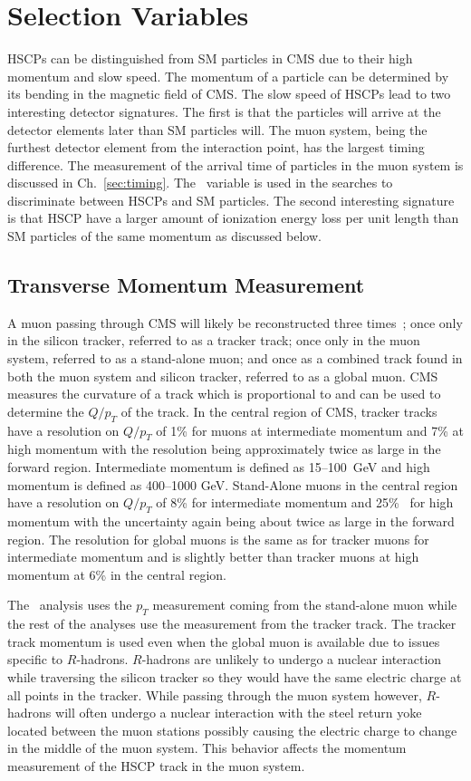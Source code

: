 \section{Selection Variables \label{sec:SelVar}}
HSCPs can be distinguished from SM particles in CMS due to their high momentum and slow speed.
The momentum of a particle can be determined by its bending in the magnetic field of CMS.
The slow speed of HSCPs lead to two interesting detector signatures. The first is that the particles will arrive at the detector elements later than SM particles will.
The muon system, being the furthest detector element from the interaction point, has the largest timing difference. The measurement of the arrival time of particles in the
muon system is discussed in Ch.~\ref{sec:timing}. The \invbeta\ variable is used in the searches to discriminate between HSCPs and SM particles.
The second interesting signature is that HSCP have a larger amount of ionization energy loss per unit length 
than SM particles of the same momentum as discussed below.

\subsection{Transverse Momentum Measurement \label{sec:PMeasurement}}
A muon passing through CMS will likely be reconstructed three times~\cite{2012JInst...7P0002T}; once only in the silicon tracker, referred to as a tracker track;
once only in the muon system, referred to as a stand-alone muon; and once as a combined track found in both the muon system and silicon tracker, referred
to as a global muon. CMS measures the curvature of a track which is proportional to and can be used to determine the $Q/p_T$ of the track.
In the central region of CMS, tracker tracks have a resolution on $Q/p_T$ of 1\% for muons at intermediate momentum and 7\% at
high momentum with the resolution being approximately
twice as large in the forward region. Intermediate momentum is defined as 15--100~GeV and high momentum is defined as 400--1000 GeV.
Stand-Alone muons in the central region have a resolution on $Q/p_T$ of 8\% for intermediate momentum and 25\%~\cite{2008AN097} for high momentum with the uncertainty again
being about twice as large in the forward region. The resolution for global muons is the same as for tracker muons for intermediate momentum and is slightly better
than tracker muons at high momentum at 6\% in the central region.

The \muononly\ analysis uses the $p_T$ measurement coming from the stand-alone muon while the rest of the analyses use the measurement from the tracker track.
The tracker track momentum is used even when the global muon is available due to issues specific to $R$-hadrons.
$R$-hadrons are unlikely to undergo a nuclear interaction while traversing the silicon tracker so they would have the same electric charge at all points in the tracker.
While passing through the muon system however, $R$-hadrons will often undergo a nuclear interaction with the steel return yoke located between the muon stations
possibly causing the electric charge to change in the middle of the muon system. This behavior affects the momentum measurement of the HSCP track in the muon system.

